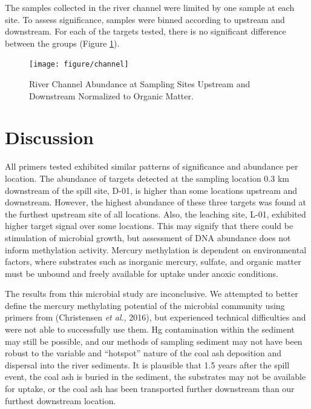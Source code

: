 \documentclass[ms, hidelinks]{uncgdissertationexp}
\theoremstyle{plain}
\theoremstyle{definition}
\theoremstyle{remark}
\begin{document}
The samples collected in the river channel were limited by one sample at each site. To assess significance, samples were binned according to upstream and downstream. For each of the targets tested, there is no significant difference between the groups (Figure \ref{fig:channel}).
\begin{figure}[htbp]
  \texttt{[image: figure/channel]}
  \caption[River Channel Abundance at Sampling Sites Upstream and Downstream Normalized to Organic Matter.]{River Channel Abundance at Sampling Sites Upstream and Downstream Normalized to Organic Matter.}\label{fig:channel}
\end{figure}
\hypertarget{discussion}{%
\section{Discussion}\label{discussion}}

All primers tested exhibited similar patterns of significance and abundance per location. The abundance of targets detected at the sampling location 0.3 km downstream of the spill site, D-01, is higher than some locations upstream and downstream. However, the highest abundance of these three targets was found at the furthest upstream site of all locations. Also, the leaching site, L-01, exhibited higher target signal over some locations. This may signify that there could be stimulation of microbial growth, but assessment of DNA abundance does not inform methylation activity. Mercury methylation is dependent on environmental factors, where substrates such as inorganic mercury, sulfate, and organic matter must be unbound and freely available for uptake under anoxic conditions.

The results from this microbial study are inconclusive. We attempted to better define the mercury methylating potential of the microbial community using primers from (Christensen \emph{et al.}, 2016), but experienced technical difficulties and were not able to successfully use them. Hg contamination within the sediment may still be possible, and our methods of sampling sediment may not have been robust to the variable and ``hotspot'' nature of the coal ash deposition and dispersal into the river sediments. It is plausible that 1.5 years after the spill event, the coal ash is buried in the sediment, the substrates may not be available for uptake, or the coal ash has been transported further downstream than our furthest downstream location.
\end{document}
